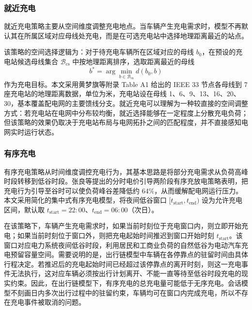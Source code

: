 \documentclass[10pt,a4paper]{article}
\numberwithin{equation}{section}
\numberwithin{table}{section}
\numberwithin{figure}{section}
\begin{document}
    \subsubsection{就近充电}

    就近充电策略主要从空间维度调整充电地点。当车辆产生充电需求时，模型不再默认其在所属区域对应母线处充电，而是在可选充电站中选择地理距离最近的站点。

    该策略的空间选择逻辑为：对于待充电车辆所在区域对应的母线 $b_0$，在预设的充电站候选母线集合 $\mathcal{B}_{\text{cs}}$ 中按地理距离排序，选取距离最近的母线
    \begin{equation}
        b^* = \arg\min_{b \in \mathcal{B}_{\text{cs}}} d(b_0, b)
    \end{equation}
    作为充电目标。本文采用黄梦旗等\supercite{ref17}附录 Table A1 给出的 IEEE 33 节点各母线到 7 座充电站的地理距离数据，单位为米，充电站设在母线 1、6、9、13、16、20、30，基本覆盖配电网的主要馈线分支。就近充电可以理解为一种较直接的空间调整方式：若充电站在电网中分布较均衡，就近选择能够在一定程度上分散充电负荷；但该策略的效果仍取决于充电站布局与电网拓扑之间的匹配程度，并不直接感知电网实时运行状态。

    \subsubsection{有序充电}

    有序充电策略从时间维度调控充电行为，其基本思路是将部分充电需求从负荷高峰时段转移到低谷时段。张良等\supercite{ref19}提出的分时电价引导两阶段有序充放电策略表明，把充电行为引导至谷时可以使负荷峰谷差降低约 64\%，从而缓解配电网运行压力。本文采用简化的集中式有序充电模型，将夜间低谷窗口 $[t_{\text{start}}, t_{\text{end}})$ 设为允许充电区间，默认取 $t_{\text{start}} = 22{:}00$、$t_{\text{end}} = 06{:}00$（次日）。

    在该策略下，车辆产生充电需求时，如果当前时刻位于充电窗口内，则立即开始充电；如果当前时刻位于窗口外，则把充电起始时间推迟到窗口开始时刻 $t_{\text{start}}$。该窗口对应电力系统夜间低谷时段，利用居民和工商业负荷的自然低谷为电动汽车充电预留容量空间。需要说明的是，出行链模型中车辆在各停靠点的驻留时间由具体行程决定。若推迟后的充电起始时间已经超过该停靠点的离开时刻，则这一充电事件无法执行，这对应车辆必须按出行计划离开、不能一直等待至低谷时段充电的现实约束。因此，在出行链模型下，有序充电的总充电量可能低于无序充电。会话模型不刻画日内多次出行过程中的驻留约束，车辆均可在窗口内完成充电，所以不存在充电事件被取消的问题。
\end{document}
